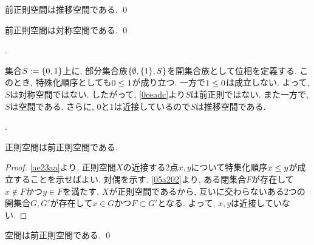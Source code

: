 \documentclass[uplatex, dvipdfmx, a4paper, 12pt, class=jsbook, crop=false]{standalone}
\begin{document}
\begin{proposition}
	前正則空間は推移空間である.
	\qed
\end{proposition}

\begin{proposition}
	\label{0ceadc}
	前正則空間は対称空間である.
	\qed
\end{proposition}

\begin{example}[\Sierpinski 空間]
	\WIP.

	集合\(S \defeq \lrbrace{0, 1}\)上に,
	部分集合族\(\lrbrace{\emptyset, \lrbrace{1}, S}\)を開集合族として位相を定義する.
	このとき, 特殊化順序としても\(0 \leq 1\)が成り立つ.
	一方で\(1 \leq 0\)は成立しない.
	よって, \(S\)は対称空間ではない.
	したがって, \cref{0ceadc}より\(S\)は前正則ではない.
	また一方で, \(S\)は空間である.
	さらに, \(0\)と\(1\)は近接しているので\(S\)は推移空間である.
\end{example}

\begin{example}[推移空間かつ対称空間であるが前正則ではない空間]
	\WIP.
\end{example}

\begin{proposition}
	正則空間は前正則空間である.
\end{proposition}

\begin{proof}
	\cref{ae23aa}より,
	正則空間\(X\)の近接する2点\(x, y\)について特集化順序\(x \leq y\)が成立することを示せばよい.
	対偶を示す.
	\cref{05a202}より,
	ある閉集合\(F\)が存在して\(x \not\in F\)かつ\(y \in F\)を満たす.
	\(X\)が正則空間であるから,
	互いに交わらないある2つの開集合\(G, G'\)が存在して\(x \in G\)かつ\(F \subset G'\)となる.
	よって, \(x, y\)は近接していない.
\end{proof}

\begin{proposition}
	\Hausdorff 空間は前正則空間である.
	\qed
\end{proposition}
\end{document}
